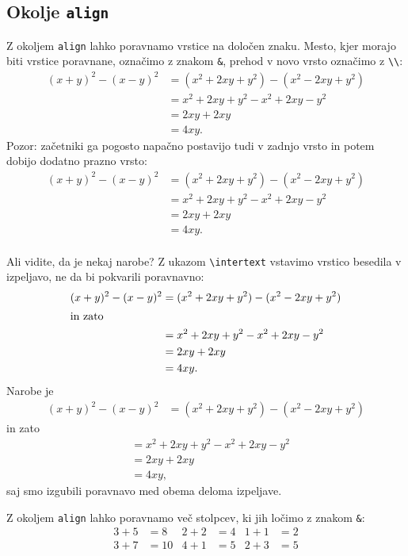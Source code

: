 \documentclass{amsart}
\begin{document}
\subsection{Okolje \texttt{align}}

Z okoljem \texttt{align} lahko poravnamo vrstice na določen znaku. Mesto, kjer morajo biti
vrstice poravnane, označimo z znakom \texttt{\&}, prehod v novo vrsto označimo z \verb|\\|:
%
\begin{align*}
  (x + y)^2 - (x - y)^2
  &= (x^2 + 2 x y + y^2) - (x^2 - 2 x y + y^2) \\
  &= x^2 + 2 x y + y^2 - x^2 + 2 x y - y^2 \\
  &= 2 x y + 2 x y \\
  &= 4 x y.
\end{align*}
%
Pozor: začetniki ga pogosto napačno postavijo tudi v zadnjo vrsto in potem dobijo dodatno
prazno vrsto:
%
\begin{align*}
  (x + y)^2 - (x - y)^2
  &= (x^2 + 2 x y + y^2) - (x^2 - 2 x y + y^2) \\
  &= x^2 + 2 x y + y^2 - x^2 + 2 x y - y^2 \\
  &= 2 x y + 2 x y \\
  &= 4 x y. \\
\end{align*}
%

Ali vidite, da je nekaj narobe? Z ukazom \verb|\intertext| vstavimo vrstico besedila v
izpeljavo, ne da bi pokvarili poravnavno:
%
\begin{align*}
  (x + y)^2 - (x - y)^2
  &= (x^2 + 2 x y + y^2) - (x^2 - 2 x y + y^2) \\
\intertext{in zato}
  &= x^2 + 2 x y + y^2 - x^2 + 2 x y - y^2 \\
  &= 2 x y + 2 x y \\
  &= 4 x y.
\end{align*}
%
Narobe je
%
\begin{align*}
  (x + y)^2 - (x - y)^2
  &= (x^2 + 2 x y + y^2) - (x^2 - 2 x y + y^2)
\end{align*}
%
in zato
%
\begin{align*}
  &= x^2 + 2 x y + y^2 - x^2 + 2 x y - y^2 \\
  &= 2 x y + 2 x y \\
  &= 4 x y,
\end{align*}
%
saj smo izgubili poravnavo med obema deloma izpeljave.

Z okoljem \texttt{align} lahko poravnamo več stolpcev, ki jih ločimo z znakom \texttt{\&}:
%
\begin{align*}
  3 + 5 &= 8
  &
  2 + 2 &= 4
  &
  1 + 1 &= 2
  \\
  3 + 7 &= 10
  &
  4 + 1 &= 5
  &
  2 + 3 &= 5
\end{align*}
\end{document}

